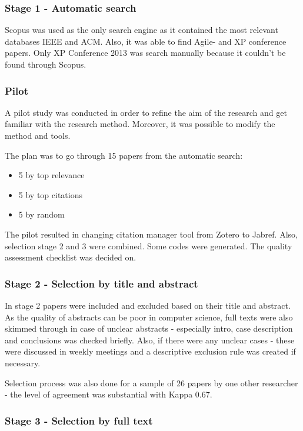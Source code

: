 \documentclass{sig-alternate}
\begin{document}
\subsubsection{Stage 1 - Automatic search}

Scopus was used as the only search engine as it contained the most relevant
databases IEEE and ACM. Also, it was able to find Agile- and XP conference
papers. Only XP Conference 2013 was search manually because it couldn't be
found through Scopus.

\subsubsection{Pilot}
\label{pilot}
A pilot study was conducted in order to refine the aim of the research and get
familiar with the research method. Moreover, it was possible to modify the
method and tools.

The plan was to go through 15 papers from the automatic search:

\begin{itemize}
  \item 5 by top relevance
  \item 5 by top citations
  \item 5 by random
\end{itemize}

The pilot resulted in changing citation manager tool from Zotero to Jabref.
Also, selection stage 2 and 3 were combined. Some codes were generated. The
quality assessment checklist was decided on.


\subsubsection{Stage 2 - Selection by title and abstract}

In stage 2 papers were included and excluded based on their title and
abstract. As the quality of abstracts can be poor in computer
science\cite{kitchenham2004procedures}, full texts were also skimmed through in case
of unclear abstracts - especially intro, case description and conclusions was
checked briefly. Also, if there were any unclear cases - these were discussed
in weekly meetings and a descriptive exclusion rule was created if necessary.

Selection process was also done for a sample of 26 papers by one other
researcher - the level of agreement was substantial with Kappa
0.67\cite{landis_measurement_1977}.

\subsubsection{Stage 3 - Selection by full text}
\end{document}
